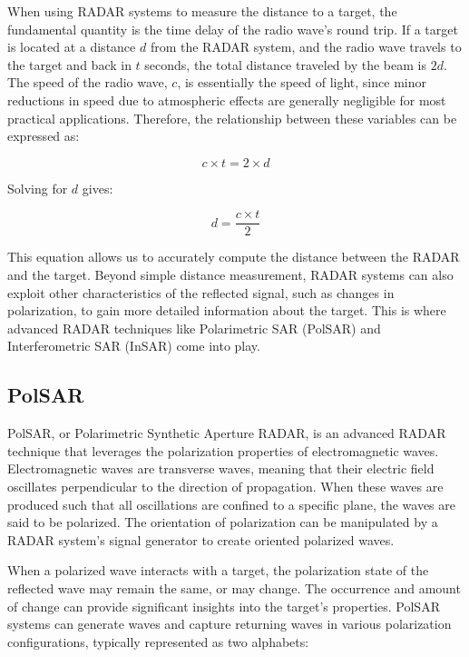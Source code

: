 \documentclass[
  12 pt,
]{Nemilov}
\begin{document}
When using RADAR systems to measure the distance to a target, the fundamental quantity is the time delay of the radio wave's round trip. If a target is located at a distance \(d\) from the RADAR system, and the radio wave travels to the target and back in \(t\) seconds, the total distance traveled by the beam is \(2d\). The speed of the radio wave, \(c\), is essentially the speed of light, since minor reductions in speed due to atmospheric effects are generally negligible for most practical applications. Therefore, the relationship between these variables can be expressed as:

\[ c \times t = 2 \times d \]

Solving for \(d\) gives:

\[ d = \frac{c \times t}{2} \]

This equation allows us to accurately compute the distance between the RADAR and the target. Beyond simple distance measurement, RADAR systems can also exploit other characteristics of the reflected signal, such as changes in polarization, to gain more detailed information about the target. This is where advanced RADAR techniques like Polarimetric SAR (PolSAR) and Interferometric SAR (InSAR) come into play.

\subsection{PolSAR}\label{polsar}

PolSAR, or Polarimetric Synthetic Aperture RADAR, is an advanced RADAR technique that leverages the polarization properties of electromagnetic waves. Electromagnetic waves are transverse waves, meaning that their electric field oscillates perpendicular to the direction of propagation. When these waves are produced such that all oscillations are confined to a specific plane, the waves are said to be polarized. The orientation of polarization can be manipulated by a RADAR system's signal generator to create oriented polarized waves.

When a polarized wave interacts with a target, the polarization state of the reflected wave may remain the same, or may change. The occurrence and amount of change can provide significant insights into the target's properties. PolSAR systems can generate waves and capture returning waves in various polarization configurations, typically represented as two alphabets:
\end{document}
